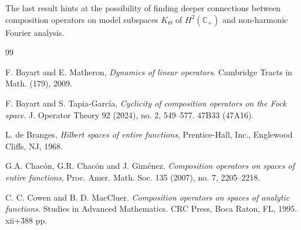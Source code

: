\documentclass[11pt]{amsart}%
\numberwithin{equation}{section}
\theoremstyle{plain}
\theoremstyle{definition}
\theoremstyle{definition}
\begin{document}
The last result hints at the possibility of finding deeper connections between  composition operators on model subspaces $K_\Theta$ of $H^2(\mathbb{C}_+)$ and non-harmonic Fourier analysis.
\begin{thebibliography}{99}  



		              
 F. Bayart and E. Matheron, \emph{Dynamics of linear operators}. Cambridge Tracts in Math. (179), 2009.

 F. Bayart and S. Tapia-García, \emph{Cyclicity of composition operators on the Fock space}. J. Operator Theory 92 (2024), no. 2, 549–577. 47B33 (47A16).

 L. de Branges, \emph{Hilbert spaces of entire functions}, Prentice-Hall, Inc., Englewood Cliffs, NJ, 1968.






 G.A. Chacón, G.R. Chacón and J. Giménez. \emph{ Composition operators on spaces of entire functions}, Proc. Amer. Math. Soc. 135 (2007), no. 7, 2205–2218.	
		
 C. C. Cowen and B. D. MacCluer. \emph{Composition operators on spaces of analytic functions.} Studies in Advanced Mathematics. CRC Press, Boca Raton, FL, 1995. xii+388 pp.	
		
		
		


\end{thebibliography}
\end{document}
